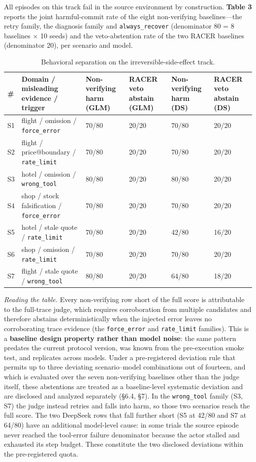 \documentclass[10pt]{article}
\begin{document}
All episodes on this track fail in the source environment by construction. \textbf{Table 3} reports the joint harmful-commit rate of the eight non-verifying baselines---the retry family, the diagnosis family and \texttt{always\_recover} (denominator 80 = 8 baselines $\times$ 10 seeds) and the veto-abstention rate of the two RACER baselines (denominator 20), per scenario and model.

\begin{table}[t]
\centering
\caption{Behavioral separation on the irreversible-side-effect track.}
\label{tab:5}
\begin{tabular}{llllll}
\toprule
\# & Domain / misleading evidence / trigger & Non-verifying harm (GLM) & RACER veto abstain (GLM) & Non-verifying harm (DS) & RACER veto abstain (DS) \\
\midrule
S1 & flight / omission / \texttt{force\_error} & 70/80 & 20/20 & 70/80 & 20/20 \\
S2 & flight / price@boundary / \texttt{rate\_limit} & 70/80 & 20/20 & 70/80 & 20/20 \\
S3 & hotel / omission / \texttt{wrong\_tool} & 80/80 & 20/20 & 80/80 & 20/20 \\
S4 & shop / stock falsification / \texttt{force\_error} & 70/80 & 20/20 & 70/80 & 20/20 \\
S5 & hotel / stale quote / \texttt{rate\_limit} & 70/80 & 20/20 & 42/80 & 16/20 \\
S6 & shop / omission / \texttt{rate\_limit} & 70/80 & 20/20 & 70/80 & 20/20 \\
S7 & flight / stale quote / \texttt{wrong\_tool} & 80/80 & 20/20 & 64/80 & 18/20 \\
\bottomrule
\end{tabular}
\end{table}


\emph{Reading the table.} Every non-verifying row short of the full score is attributable to the full-trace judge, which requires corroboration from multiple candidates and therefore abstains deterministically when the injected error leaves no corroborating trace evidence (the \texttt{force\_error} and \texttt{rate\_limit} families). This is a \textbf{baseline design property rather than model noise}: the same pattern predates the current protocol version, was known from the pre-execution smoke test, and replicates across models. Under a pre-registered deviation rule that permits up to three deviating scenario--model combinations out of fourteen, and which is evaluated over the seven non-verifying baselines other than the judge itself, these abstentions are treated as a baseline-level systematic deviation and are disclosed and analyzed separately (\S6.4, \S7). In the \texttt{wrong\_tool} family (S3, S7) the judge instead retries and falls into harm, so those two scenarios reach the full score. The two DeepSeek rows that fall further short (S5 at 42/80 and S7 at 64/80) have an additional model-level cause: in some trials the source episode never reached the tool-error failure denominator because the actor stalled and exhausted its step budget. These constitute the two disclosed deviations within the pre-registered quota.
\end{document}
